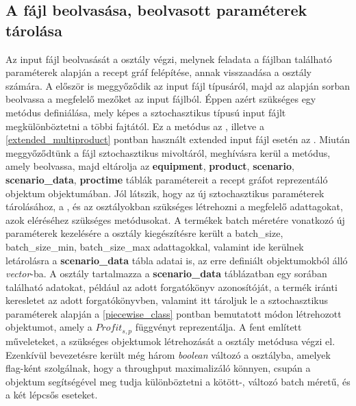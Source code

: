 \subsection{A fájl beolvasása, beolvasott paraméterek tárolása}
Az input fájl beolvasását a  osztály végzi, melynek feladata a fájlban található paraméterek alapján a recept gráf felépítése, annak visszaadása a osztály számára.
A  először is meggyőződik az input fájl típusáról, majd az alapján sorban beolvassa a megfelelő mezőket az input fájlból.
Éppen azért szükséges egy metódus definiálása, mely képes a sztochasztikus típusú input fájlt megkülönböztetni a többi fajtától.
Ez a metódus az , illetve a \ref{extended_multiproduct} pontban használt extended input fájl esetén az .
Miután meggyőződtünk a fájl sztochasztikus mivoltáról, meghívásra kerül a  metódus, amely beolvassa, majd eltárolja az \textbf{equipment}, \textbf{product}, \textbf{scenario}, \textbf{scenario\_data}, \textbf{proctime} táblák paramétereit a recept gráfot reprezentáló  objektum  objektumában.
Jól látszik, hogy az új sztochasztikus paraméterek tárolásához, a , és az  osztályokban szükséges létrehozni a megfelelő adattagokat, azok eléréséhez szükséges metódusokat.
A termékek batch méretére vonatkozó új paraméterek kezelésére a  osztály kiegészítésre került a batch\_size, batch\_size\_min, batch\_size\_max adattagokkal, valamint ide kerülnek letárolásra a \textbf{scenario\_data} tábla adatai is, az erre definiált  objektumokból álló \textit{vector}-ba.
A  osztály tartalmazza a \textbf{scenario\_data} táblázatban egy sorában található adatokat, például az adott forgatókönyv azonosítóját, a termék iránti keresletet az adott forgatókönyvben, valamint itt tároljuk le a sztochasztikus paraméterek alapján a \ref{piecewise_class} pontban bemutatott módon létrehozott  objektumot, amely a $Profit_{s,p}$ függvényt reprezentálja.
A fent említett műveleteket, a szükséges objektumok létrehozását a  osztály  metódusa végzi el.
Ezenkívül bevezetésre került még három \textit{boolean} változó a  osztályba,  amelyek flag-ként szolgálnak, hogy a throughput maximalizáló könnyen, csupán a  objektum segítségével meg tudja különböztetni a kötött-, változó batch méretű, és a két lépcsős eseteket.
